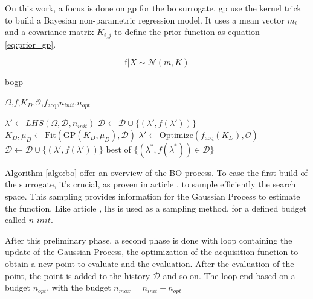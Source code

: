 On this work, a focus is done on \acrshort{gp} for the \acrshort{bo} surrogate. \acrshort{gp} use the kernel trick to build a Bayesian non-parametric regression model. It uses a mean vector $m_i$ and a covariance matrix $K_{i,j}$ to define the prior function as equation \ref{eq:prior_gp}. 

\begin{equation}
    \text{f} | X \sim  \mathcal N (m,K)
    \label{eq:prior_gp}
\end{equation}

\begin{algorithm}[h]
\caption{\acrshort{bogp}}
\label{algo:bo}
\begin{algorithmic}[1]
\Require 
    $\Omega$,$f$,$K_D$,$\mathcal{O}$,$f_{\text{acq}}$,$n_{init} $,$n_{opt}$
        
 
    \State $\lambda' \gets LHS(\Omega,\mathcal{D},n_{init})$ 
    \State $\mathcal{D} \gets \mathcal{D} \cup \{(\lambda', f(\lambda'))\}$ 
\EndFor 
{} 
    \State $K_D,\mu_D \gets \text{Fit}(\text{GP}(K_D,\mu_D), \mathcal{D})$ 
    \State $\lambda' \gets \text{Optimize}(f_{\text{acq}}(K_D), \mathcal{O})$ 
    \State $\mathcal{D} \gets \mathcal{D} \cup \{(\lambda', f(\lambda'))\}$ 
\EndFor
\State \Return best of $\{(\lambda^*, f(\lambda^*)) \in \mathcal{D}\}$
\end{algorithmic}
\end{algorithm}

Algorithm \ref{algo:bo} offer an overview of the BO process. To ease the first build of the surrogate, it's crucial, as proven in article \cite{wilson_efficiently_2020}, to sample efficiently the search space. This sampling provides information for the Gaussian Process to estimate the function. Like article \cite{borisut_adaptive_2023}, \acrfull{lhs} is used as a sampling method, for a defined budget called $n\_init$. 

After this preliminary phase, a second phase is done with loop containing the update of the Gaussian Process, the optimization of the acquisition function to obtain a new point to evaluate and the evaluation. After the evaluation of the point, the point is added to the history $\mathcal D$ and so on. The loop end based on a budget $n_{opt}$, with the budget $n_{max}=n_{init}+n_{opt}$ 

